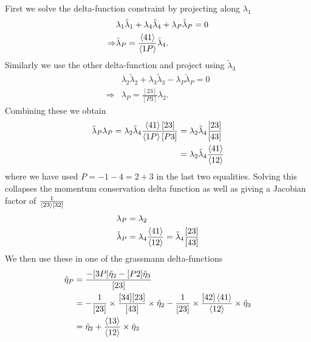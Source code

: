 \documentclass[letter,11pt]{article}
\begin{document}
First we solve the delta-function constraint by projecting along $\lambda_1$
\begin{equation}
	\begin{aligned}
		&\lambda_{1}\tilde\lambda_{1}+\lambda_{4}\tilde\lambda_{4}+\lambda_{P}\tilde\lambda_{P}=0\\
		\Rightarrow& \tilde\lambda_{P}=\frac{\expval{41}}{\expval{1P}}\tilde\lambda_4.
	\end{aligned}
\end{equation}
Similarly we use the other delta-function and project using $\tilde \lambda_3$
\begin{equation}
	\begin{aligned}
		&\lambda_{2}\tilde\lambda_{2}+\lambda_{3}\tilde\lambda_{3}-\lambda_{P}\tilde\lambda_{P}=0\\
		\Rightarrow& 
		\lambda_{P}=\frac{[23]}{[P3]}\lambda_2.
	\end{aligned}
\end{equation}
Combining these we obtain
\begin{equation}
	\begin{aligned}
		\tilde\lambda_P \lambda_P=\lambda_2 \tilde\lambda_4 \frac{\expval{41}[23]}{\expval{1P}[P3]}&=\lambda_2 \tilde\lambda_4 \frac{[23]}{[43]}\\
		&=\lambda_2 \tilde\lambda_4 \frac{\expval{41}}{\expval{12}}
 	\end{aligned}
\end{equation}
where we have used $P=-1-4=2+3$ in the last two equalities. Solving this collapses the momentum conservation delta function as well as giving a Jacobian factor of $\frac{1}{\expval{23}[32]}$
\begin{equation} \label{eq:sol3}
	\begin{aligned}
		\lambda_P&=\lambda_2\\
		\tilde \lambda_P&=\lambda_4 \frac{\expval{41}}{\expval{12}}=\tilde\lambda_4 \frac{[23]}{[43]}
	\end{aligned}
\end{equation}
We then use these in one of the grassmann delta-functions
\begin{equation}
	\begin{aligned}
		\tilde\eta_{P}&=\frac{-[3P]\tilde\eta_{2}-[P 2]\tilde\eta_{3}}{[23]}\\
		&=-\frac{1}{[23]}\times \frac{[34][23]}{[43]} \times\tilde \eta_2-\frac{1}{[23]}\times \frac{[42]\expval{41}}{\expval{12}} \times\tilde \eta_3\\
		&=\tilde \eta_2+ \frac{\expval{13}}{\expval{12}} \times\tilde \eta_3\\
	\end{aligned}
\end{equation}
\end{document}
